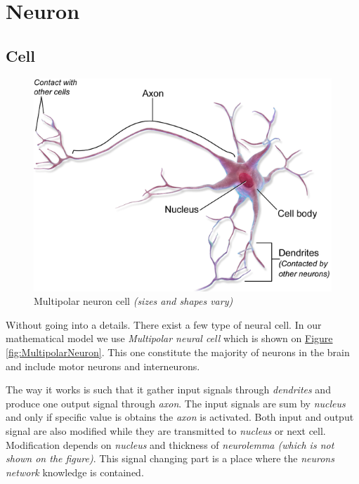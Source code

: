 \section{Neuron}

\subsection{Cell}

\begin{figure}[!h]
    \centering
    \includegraphics[scale=1]{Media/MultipolarNeuron.png}
    \caption[Multipolar neuron cell]{Multipolar neuron cell \textit{(sizes and shapes vary)}}
    \label{fig:MultipolarNeuronCell}
\end{figure}

Without going into a details. There exist a few type of neural cell. In our mathematical model we use \textit{Multipolar neural cell} which is shown on \hyperref[fig:MultipolarNeuron]{Figure \ref{fig:MultipolarNeuron}}. This one constitute the majority of neurons in the brain and include motor neurons and interneurons.

The way it works is such that it gather input signals through \textit{dendrites} and produce one output signal through \textit{axon}. The input signals are sum by \textit{nucleus} and only if specific value is obtains the \textit{axon} is activated. Both input and output signal are also modified while they are transmitted to \textit{nucleus} or next cell. Modification depends on \textit{nucleus} and thickness of \textit{neurolemma (which is not shown on the figure)}. This signal changing part is a place where the \textit{neurons network} knowledge is contained.

